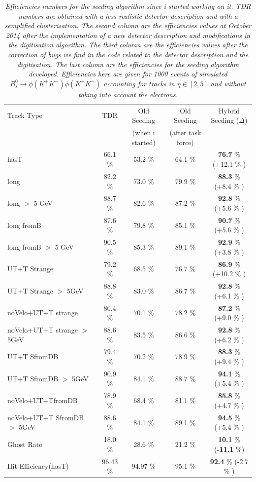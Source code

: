 \documentclass[paper=a4, fontsize=10pt]{scrartcl}
\numberwithin{equation}{section}		%
\numberwithin{figure}{section}			%
\numberwithin{table}{section}				%
\begin{document}
\begin{table}[h!]
\centering 
\begin{tabular}{|l|c|c|c|c}
Track Type & TDR & Old Seeding & Old Seeding & Hybrid Seeding ($\Delta$) \\
  & & (when i started) & (after task force) & \\
\hline
hasT & 66.1 \% &   53.2 \% & 64.1 \% & \textbf{76.7} \% (+12.1 \% )\\
long & 82.2 \% &   73.0 \% & 79.9 \% & \textbf{88.3} \% (+8.4 \% )  \\
long $>$ 5 GeV & 88.7 \% &  82.6 \% & 87.2 \% & \textbf{92.8} \%  (+5.6 \% )  \\ \hline
long fromB & 87.6 \% &  79.8 \% & 85.1 \% &\textbf{90.7} \%  (+5.6 \% )  \\
long fromB $>$ 5 GeV & 90.5 \% &  85.3 \% & 89.1 \% &\textbf{92.9} \% (+3.8 \% ) \\ \hline
UT+T Strange & 79.2 \% &  68.5 \% & 76.7 \% & \textbf{86.9} \%  (+10.2 \% ) \\
UT+T Strange $>$ 5GeV & 88.8 \% & 83.0 \% & 86.7 \% & \textbf{92.8} \%  (+6.1 \% ) \\ \hline
noVelo+UT+T strange & 80.4 \% & 70.1 \% & 78.2 \% & \textbf{87.2} \%   (+9.0 \% )  \\
noVelo+UT+T strange $>$ 5GeV & 88.6 \% & 83.5 \% & 86.6 \% & \textbf{92.8} \% (+6.2 \% ) \\ \hline
UT+T SfromDB & 79.4 \% &  70.2 \% & 78.9 \% & \textbf{88.3} \% (+9.4 \% ) \\
UT+T SfromDB $>$ 5GeV & 90.9 \% &   84.1 \% & 88.7 \% & \textbf{94.1} \% (+5.4 \% )\\ \hline
noVelo+UT+TfromDB & 78.9 \% & 68.4 \% & 81.1 \% & \textbf{85.8} \%  (+4.7 \% )\\
noVelo+UT+T SfromDB $>$ 5GeV & 88.6 \% & 84.1 \% & 89.1 \% & \textbf{94.5} \% (+5.4 \% )\\ \hline
Ghost Rate & 18.0 \% & 28.6 \% & 21.2 \% & \textbf{10.1} \%  (\textbf{-11.1} \%)  \\
Hit Efficiency(hasT) & 96.43 \% & 94.97 \% & 95.1 \% & \textbf{92.4} \% (-2.7 \% ) \\
\end{tabular}
\caption{\emph{Efficiencies numbers for the seeding algorithm since i started working on it.
TDR numbers are obtained with a less realistic detector description and with a semplified clusterisation. The second column are the efficiencies values at October 2014 after the implementation of a new detector description and modifications in the digitisation algorithm. The third column are the efficiencies values after the correction of bugs we find in the code related to the detector description and the digitisation. The last column are the efficiencies for the seeding algorithm developed. Efficiencies here are given for 1000 events of simulated $B^{0}_{s}\rightarrow \phi(K^+K^-)\phi(K^{+}K^{-})$ accounting for tracks in $\eta \in  [2,5]$ and without taking into account the electrons.}}\label{table}
\end{table}
\end{document}
